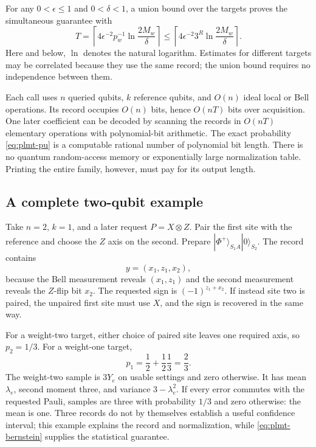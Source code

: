 \documentclass[11pt,a4paper]{article}
\numberwithin{equation}{section}
\theoremstyle{definition}
\theoremstyle{remark}
\begin{document}
For any \(0<\epsilon\leq1\) and \(0<\delta<1\), a union bound over the targets proves the simultaneous guarantee with
\begin{equation}
 T=
 \left\lceil4\epsilon^{-2}p_w^{-1}
 \ln\frac{2M_w}{\delta}\right\rceil
 \leq
 \left\lceil4\epsilon^{-2}3^R
 \ln\frac{2M_w}{\delta}\right\rceil.
 \label{eq:plmt-upper}
\end{equation}
Here and below, \(\ln\) denotes the natural logarithm. Estimates for different targets may be correlated because they use the same record; the union bound requires no independence between them.

Each call uses \(n\) queried qubits, \(k\) reference qubits, and \(O(n)\) ideal local or Bell operations. Its record occupies \(O(n)\) bits, hence \(O(nT)\) bits over acquisition. One later coefficient can be decoded by scanning the records in \(O(nT)\) elementary operations with polynomial-bit arithmetic. The exact probability \eqref{eq:plmt-pu} is a computable rational number of polynomial bit length. There is no quantum random-access memory or exponentially large normalization table. Printing the entire family, however, must pay for its output length.

\subsection{A complete two-qubit example}
Take \(n=2\), \(k=1\), and a later request \(P=X\otimes Z\). Pair the first site with the reference and choose the \(Z\) axis on the second. Prepare \(|\Phi^+\rangle_{S_1A}|0\rangle_{S_2}\). The record contains
\[
 y=(x_1,z_1,x_2),
\]
because the Bell measurement reveals \((x_1,z_1)\) and the second measurement reveals the \(Z\)-flip bit \(x_2\). The requested sign is \((-1)^{z_1+x_2}\). If instead site two is paired, the unpaired first site must use \(X\), and the sign is recovered in the same way.

For a weight-two target, either choice of paired site leaves one required axis, so \(p_2=1/3\). For a weight-one target,
\[
 p_1=\frac12+\frac12\frac13=\frac23.
\]
The weight-two sample is \(3Y_e\) on usable settings and zero otherwise. It has mean \(\lambda_e\), second moment three, and variance \(3-\lambda_e^2\). If every error commutes with the requested Pauli, samples are three with probability \(1/3\) and zero otherwise: the mean is one. Three records do not by themselves establish a useful confidence interval; this example explains the record and normalization, while \eqref{eq:plmt-bernstein} supplies the statistical guarantee.
\end{document}
